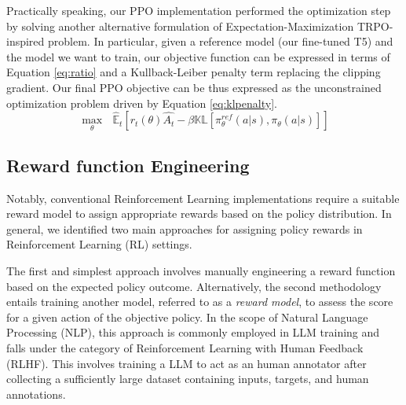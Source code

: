 \documentclass{article}
\begin{document}
Practically speaking, our PPO implementation performed the optimization step by solving another alternative formulation of Expectation-Maximization TRPO-inspired problem. In particular, given a reference model (our fine-tuned T5) and the model we want to train, our objective function can be expressed in terms of Equation \ref{eq:ratio} and a Kullback-Leiber penalty term replacing the clipping gradient. Our final PPO objective can be thus expressed as the unconstrained optimization problem driven by Equation \ref{eq:klpenalty}.
\begin{equation}
    \max_{\theta} \text{ }\mathbb{\hat{E}}_t[r_t(\theta)\hat{A_t} - \beta\mathbb{KL}[\pi_{\theta}^{ref}(a\vert s), \pi_{\theta}(a\vert s)]]
    \label{eq:klpenalty}
\end{equation}

\subsection{Reward function Engineering}
\label{reward_function_eng}
Notably, conventional Reinforcement Learning implementations require a suitable reward model to assign appropriate rewards based on the policy distribution. In general, we identified two main approaches for assigning policy rewards in Reinforcement Learning (RL) settings.

The first and simplest approach involves manually engineering a reward function based on the expected policy outcome. Alternatively, the second methodology entails training another model, referred to as a \textit{reward model}, to assess the score for a given action of the objective policy. In the scope of Natural Language Processing (NLP), this approach is commonly employed in LLM training and falls under the category of Reinforcement Learning with Human Feedback (RLHF). This involves training a LLM to act as an human annotator after collecting a sufficiently large dataset containing inputs, targets, and human annotations.
\end{document}
